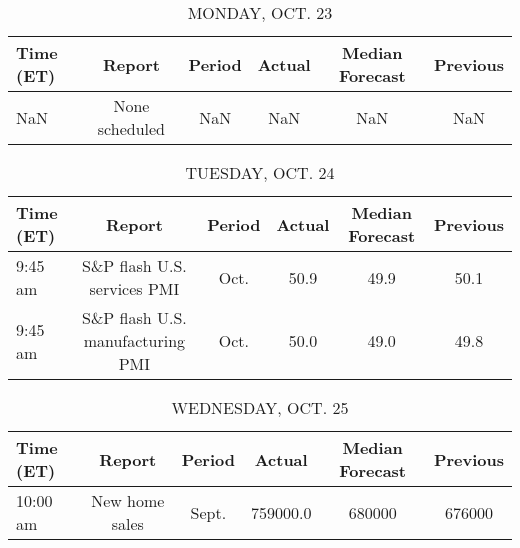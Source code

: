 \documentclass{article}%
\begin{document}
%
\normalsize%


\begin{table}[htbp]%
\caption{MONDAY, OCT. 23}%
\centering%
\begin{adjustbox}{width=1\textwidth}%
\begin{tabular}{lccccc}
\toprule
Time (ET) &         Report & Period & Actual & Median Forecast & Previous \\
\midrule
      NaN & None scheduled &    NaN &    NaN &             NaN &      NaN \\
\bottomrule
\end{tabular}
%
\end{adjustbox}%
\end{table}

%


\begin{table}[htbp]%
\caption{TUESDAY, OCT. 24}%
\centering%
\begin{adjustbox}{width=1\textwidth}%
\begin{tabular}{lccccc}
\toprule
Time (ET) &                           Report & Period & Actual & Median Forecast & Previous \\
\midrule
  9:45 am &      S\&P flash U.S. services PMI &   Oct. &   50.9 &            49.9 &     50.1 \\
  9:45 am & S\&P flash U.S. manufacturing PMI &   Oct. &   50.0 &            49.0 &     49.8 \\
\bottomrule
\end{tabular}
%
\end{adjustbox}%
\end{table}

%


\begin{table}[htbp]%
\caption{WEDNESDAY, OCT. 25}%
\centering%
\begin{adjustbox}{width=1\textwidth}%
\begin{tabular}{lccccc}
\toprule
Time (ET) &         Report & Period &    Actual & Median Forecast & Previous \\
\midrule
 10:00 am & New home sales &  Sept. &  759000.0 &          680000 &   676000 \\
\bottomrule
\end{tabular}
%
\end{adjustbox}%
\end{table}

%
\end{document}
